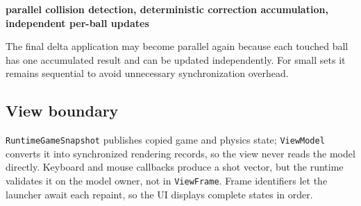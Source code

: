 \begin{center}
\textbf{parallel collision detection, deterministic correction accumulation, independent per-ball updates}
\end{center}

The final delta application may become parallel again because each touched
ball has one accumulated result and can be updated independently. For small
sets it remains sequential to avoid unnecessary synchronization overhead.

\subsection{View boundary}

\texttt{RuntimeGameSnapshot} publishes copied game and physics state;
\texttt{ViewModel} converts it into synchronized rendering records, so the view
never reads the model directly. Keyboard and mouse callbacks produce a shot
vector, but the runtime validates it on the model owner, not in
\texttt{ViewFrame}. Frame identifiers let the launcher await each repaint, so
the UI displays complete states in order.
